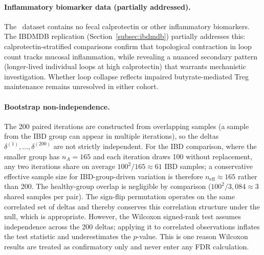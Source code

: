 \paragraph{Inflammatory biomarker data (partially addressed).}
The \agp\ dataset contains no fecal calprotectin or other inflammatory
biomarkers.
The IBDMDB replication (Section~\ref{subsec:ibdmdb}) partially addresses
this: calprotectin-stratified comparisons confirm that topological
contraction in loop count tracks mucosal inflammation, while revealing
a nuanced secondary pattern (longer-lived individual loops at high
calprotectin) that warrants mechanistic investigation.
Whether loop collapse reflects impaired butyrate-mediated Treg
maintenance remains unresolved in either cohort.

\paragraph{Bootstrap non-independence.}
The 200 paired iterations are constructed from overlapping samples (a sample
from the IBD group can appear in multiple iterations), so the deltas
$\delta^{(1)}, \ldots, \delta^{(200)}$ are not strictly independent.
For the IBD comparison, where the smaller group has $n_A = 165$
and each iteration draws 100 without replacement, any two iterations
share on average $100^2 / 165 \approx 61$ IBD samples; a conservative
effective sample size for IBD-group-driven variation is therefore
$n_\text{eff} \approx 165$ rather than 200.
The healthy-group overlap is negligible by comparison
($100^2 / 3{,}084 \approx 3$ shared samples per pair).
The sign-flip permutation operates on the same correlated set of deltas
and thereby conserves this correlation structure under the null, which is
appropriate.
However, the Wilcoxon signed-rank test assumes independence across the
200 deltas; applying it to correlated observations inflates the test
statistic and underestimates the $p$-value.
This is one reason Wilcoxon results are treated as confirmatory only and
never enter any FDR calculation.
